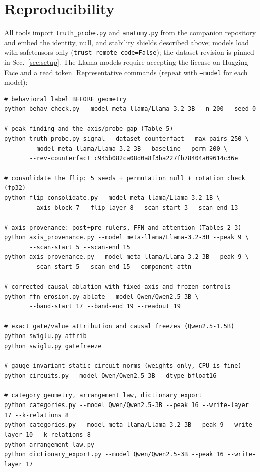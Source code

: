 \documentclass[11pt]{article}
\begin{document}
\section{Reproducibility}
\label{sec:repro}

All tools import \texttt{truth\_probe.py} and \texttt{anatomy.py} from the
companion repository and embed the identity, null, and stability shields
described above; models load with safetensors only
(\texttt{trust\_remote\_code=False}); the dataset revision is pinned in
Sec.~\ref{sec:setup}. The Llama models require accepting the license on
Hugging Face and a read token. Representative commands (repeat with
\texttt{--model} for each model):

\begin{verbatim}
# behavioral label BEFORE geometry
python behav_check.py --model meta-llama/Llama-3.2-3B --n 200 --seed 0

# peak finding and the axis/probe gap (Table 5)
python truth_probe.py signal --dataset counterfact --max-pairs 250 \
       --model meta-llama/Llama-3.2-3B --baseline --perm 200 \
       --rev-counterfact c945b082ca08d0a8f3ba227fb78404a09614c36e

# consolidate the flip: 5 seeds + permutation null + rotation check (fp32)
python flip_consolidate.py --model meta-llama/Llama-3.2-1B \
       --axis-block 7 --flip-layer 8 --scan-start 3 --scan-end 13

# axis provenance: post+pre rulers, FFN and attention (Tables 2-3)
python axis_provenance.py --model meta-llama/Llama-3.2-3B --peak 9 \
       --scan-start 5 --scan-end 15
python axis_provenance.py --model meta-llama/Llama-3.2-3B --peak 9 \
       --scan-start 5 --scan-end 15 --component attn

# corrected causal ablation with fixed-axis and frozen controls
python ffn_erosion.py ablate --model Qwen/Qwen2.5-3B \
       --band-start 17 --band-end 19 --readout 19

# exact gate/value attribution and causal freezes (Qwen2.5-1.5B)
python swiglu.py attrib
python swiglu.py gatefreeze

# gauge-invariant static circuit norms (weights only, CPU is fine)
python circuits.py --model Qwen/Qwen2.5-3B --dtype bfloat16

# category geometry, arrangement law, dictionary export
python categories.py --model Qwen/Qwen2.5-3B --peak 16 --write-layer 17 --k-relations 8
python categories.py --model meta-llama/Llama-3.2-3B --peak 9 --write-layer 10 --k-relations 8
python arrangement_law.py
python dictionary_export.py --model Qwen/Qwen2.5-3B --peak 16 --write-layer 17
\end{verbatim}
\end{document}

